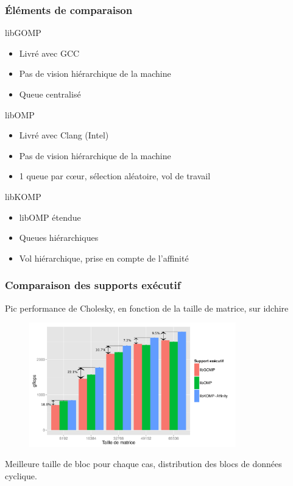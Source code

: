 \documentclass[xcolor={usenames,dvipsnames,svgnames,table}, aspectratio=43]{beamer}
\begin{document}
\begin{frame}
  \frametitle{Éléments de comparaison}

  \begin{block}{libGOMP}
    \begin{itemize}
      \item Livré avec GCC
      \item Pas de vision hiérarchique de la machine
      \item Queue centralisé
    \end{itemize}
  \end{block}

  \begin{block}{libOMP}
    \begin{itemize}
      \item Livré avec Clang (Intel)
      \item Pas de vision hiérarchique de la machine
      \item 1 queue par cœur, sélection aléatoire, vol de travail
    \end{itemize}
  \end{block}

  \begin{block}{libKOMP}
    \begin{itemize}
      \item libOMP étendue
      \item Queues hiérarchiques
      \item Vol hiérarchique, prise en compte de l'affinité
    \end{itemize}
  \end{block}

\end{frame}




\begin{frame}
  \frametitle{Comparaison des supports exécutif}
  Pic performance de Cholesky, en fonction de la taille de matrice, sur idchire
  \begin{figure}
    \includegraphics[width=0.8\textwidth]{graph/graph_details_cholesky_idchire.pdf}
  \end{figure}
  Meilleure taille de bloc pour chaque cas, distribution des blocs de données cyclique.
\end{frame}
\end{document}
